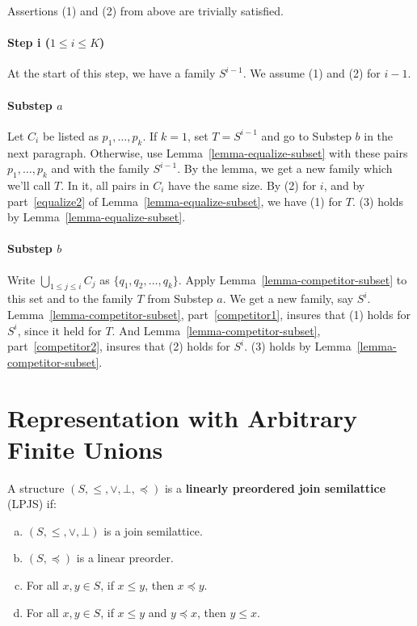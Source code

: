 \documentclass[12pt]{article}
\theoremstyle{definition}
\newcommand{\set}[1]{\{ #1 \}}
\begin{document}
 Assertions (1) and (2) from above are trivially satisfied.
 
 \paragraph{Step i ($1 \leq i \leq K$)}
 At the start of this step, we have a family $S^{i-1}$.
 We assume (1) and (2) for $i -1$.
 
 \paragraph{Substep $a$}
 Let $C_i$ be listed as $p_1, \ldots, p_k$.
 If $k = 1$, set $T = S^{i-1}$ and go to  Substep $b$ in the 
 next paragraph.  Otherwise, 
  use Lemma~\ref{lemma-equalize-subset} with these pairs 
  $p_1, \ldots, p_k$ and with the family
  $S^{i-1}$.
  By the lemma, we get a new family which we'll call $T$.
  In it, all pairs in $C_i$ have the same size.
 By (2) for $i$, and by part~\ref{equalize2} of Lemma~\ref{lemma-equalize-subset},
 we have (1) for $T$.
 (3) holds by  Lemma~\ref{lemma-equalize-subset}.
  
 \paragraph{Substep $b$}  
Write $\bigcup_{1\leq j \leq i} C_j$ as 
$\set{q_1, q_2,\ldots, q_k}$.
Apply Lemma~\ref{lemma-competitor-subset}
to this set and to the family $T$
from Substep $a$.  We get a new family, say 
$S^i$.  
Lemma~\ref{lemma-competitor-subset}, part~\ref{competitor1}, insures that (1) holds for $S^i$, since it held for $T$.
 And Lemma~\ref{lemma-competitor-subset}, part~\ref{competitor2},
 insures that (2) holds for $S^i$.
  (3) holds by  Lemma~\ref{lemma-competitor-subset}.


\section{Representation with Arbitrary Finite Unions}

\newcommand{\Add}{\text{Add}}

A structure $(S,\leq, \vee, \bot, \preceq)$ is a \textbf{linearly preordered join semilattice} (LPJS) if: 
\begin{enumerate}[(a)]
    \item $(S,\leq,\vee,\bot)$ is a join semilattice. 
    \item $(S,\preceq)$ is a linear preorder.
    \item For all $x,y\in S$, if $x\leq y$, then $x\preceq y$.
    \item For all $x,y\in S$, if $x\leq y$ and $y\preceq x$, then $y\leq x$. 
\end{enumerate}
\end{document}
